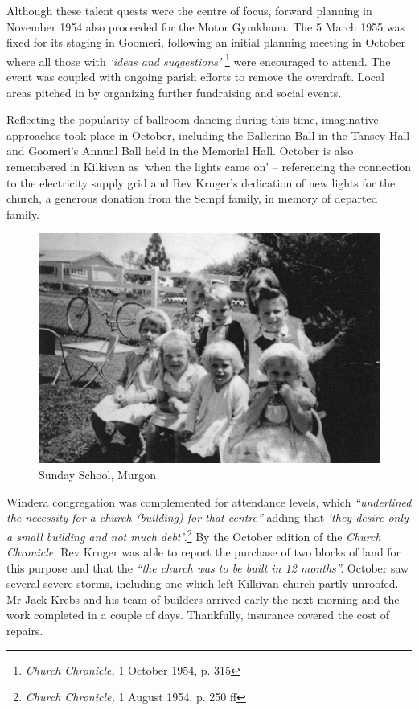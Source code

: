 Although these talent quests were the centre of focus, forward planning in November 1954 also proceeded for the Motor Gymkhana. The 5 March 1955 was fixed for its staging in Goomeri, following an initial planning meeting in October where all those with \emph{`ideas and suggestions'} \footnote{\emph{Church Chronicle,} 1 October 1954, p. 315} were encouraged to attend. The event was coupled with ongoing parish efforts to remove the overdraft. Local areas pitched in by organizing further fundraising and social events.


Reflecting the popularity of ballroom dancing during this time, imaginative approaches took place in October, including the Ballerina Ball in the Tansey Hall and Goomeri's Annual Ball held in the Memorial Hall. October is also remembered in Kilkivan as \emph{`}when the lights came on' -- referencing the connection to the electricity supply grid and Rev Kruger's dedication of new lights for the church, a generous donation from the Sempf family, in memory of departed family.









\begin{figure}
\begin{center}
\includegraphics[width=1.\linewidth,center]{../images/sundaySchoolMurgon.jpg}
\caption{Sunday School, Murgon}
\end{center}
\end{figure}




Windera congregation was complemented for attendance levels, which \emph{``underlined the necessity for a church (building) for that centre''} adding that \emph{`they desire only a small building and not much debt'}.\footnote{\emph{Church Chronicle,} 1 August 1954, p. 250 ff} By the October edition of the \emph{Church Chronicle,} Rev Kruger was able to report the purchase of two blocks of land for this purpose and that the \emph{``the church was to be built in 12 months''.} October saw several severe storms, including one which left Kilkivan church partly unroofed. Mr Jack Krebs and his team of builders arrived early the next morning and the work completed in a couple of days. Thankfully, insurance covered the cost of repairs.


